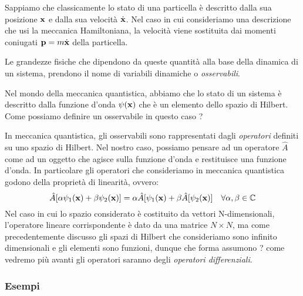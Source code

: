 \noindent Sappiamo che classicamente lo stato di una particella \`e descritto dalla sua posizione $\bold{x} $ e dalla sua velocit\`a $\dot{\bold{x}}$. Nel caso in cui consideriamo una descrizione che usi la meccanica Hamiltoniana, la velocit\`a viene sostituita dai momenti coniugati $\bold{p} = m \dot{\bold{x}}$ della particella.

\noindent Le grandezze fisiche che dipendono da queste quantit\`a alla base della dinamica di un sistema, prendono il nome di variabili dinamiche o \textit{osservabili}.
\newline

\noindent Nel mondo della meccanica quantistica, abbiamo che lo stato di un sistema \`e descritto dalla funzione d'onda $\psi(\bold{x})$ che \`e un elemento dello spazio di Hilbert. Come possiamo definire un osservabile in questo caso ? 
\newline 

\noindent In meccanica quantistica, gli osservabili sono rappresentati dagli \textit{operatori} definiti su uno spazio di Hilbert. Nel nostro caso, possiamo pensare ad un operatore  $\hat{A}$ come ad un oggetto che agisce sulla funzione d'onda e restituisce una funzione d'onda. In particolare gli operatori che consideriamo in meccanica quantistica godono della propriet\`a di linearit\`a,  ovvero:
\begin{equation}
	\hat{A}[\alpha \psi_1(\bold{x})+ \beta \psi_2(\bold{x})] = \alpha \hat{A}[\psi_1(\bold{x}) + \beta \hat{A}[\psi_2(\bold{x})] 
	\quad \forall \alpha,\beta \in \mathbb{C}
\end{equation}
\noindent Nel caso in cui lo spazio considerato \`e costituito da vettori N-dimensionali, l'operatore lineare corrispondente \`e dato da una matrice $N \times N$, ma come precedentemente discusso gli spazi di Hilbert che consideriamo sono infinito dimensionali e gli elementi sono funzioni, dunque che forma assumono ? come vedremo pi\`u avanti gli operatori saranno degli \textit{operatori differenziali}.

\subsubsection{Esempi}

